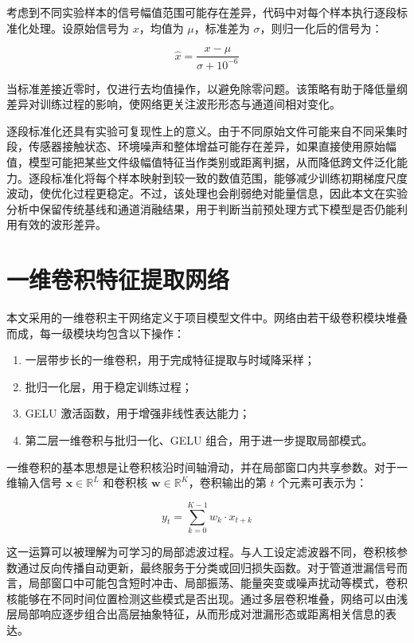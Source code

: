考虑到不同实验样本的信号幅值范围可能存在差异，代码中对每个样本执行逐段标准化处理。设原始信号为 $x$，均值为 $\mu$，标准差为 $\sigma$，则归一化后的信号为：

\begin{equation}
\hat{x} = \frac{x - \mu}{\sigma + 10^{-6}}
\end{equation}

当标准差接近零时，仅进行去均值操作，以避免除零问题。该策略有助于降低量纲差异对训练过程的影响，使网络更关注波形形态与通道间相对变化。

逐段标准化还具有实验可复现性上的意义。由于不同原始文件可能来自不同采集时段，传感器接触状态、环境噪声和整体增益可能存在差异，如果直接使用原始幅值，模型可能把某些文件级幅值特征当作类别或距离判据，从而降低跨文件泛化能力。逐段标准化将每个样本映射到较一致的数值范围，能够减少训练初期梯度尺度波动，使优化过程更稳定。不过，该处理也会削弱绝对能量信息，因此本文在实验分析中保留传统基线和通道消融结果，用于判断当前预处理方式下模型是否仍能利用有效的波形差异。

\section{一维卷积特征提取网络}

本文采用的一维卷积主干网络定义于项目模型文件中。网络由若干级卷积模块堆叠而成，每一级模块均包含以下操作：

\begin{enumerate}
  \item 一层带步长的一维卷积，用于完成特征提取与时域降采样；
  \item 批归一化层，用于稳定训练过程；
  \item GELU 激活函数，用于增强非线性表达能力；
  \item 第二层一维卷积与批归一化、GELU 组合，用于进一步提取局部模式。
\end{enumerate}

一维卷积的基本思想是让卷积核沿时间轴滑动，并在局部窗口内共享参数。对于一维输入信号 $\mathbf{x} \in \mathbb{R}^{L}$ 和卷积核 $\mathbf{w} \in \mathbb{R}^{K}$，卷积输出的第 $t$ 个元素可表示为：

\begin{equation}
y_t = \sum_{k=0}^{K-1} w_k \cdot x_{t + k}
\end{equation}

这一运算可以被理解为可学习的局部滤波过程。与人工设定滤波器不同，卷积核参数通过反向传播自动更新，最终服务于分类或回归损失函数。对于管道泄漏信号而言，局部窗口中可能包含短时冲击、局部振荡、能量突变或噪声扰动等模式，卷积核能够在不同时间位置检测这些模式是否出现。通过多层卷积堆叠，网络可以由浅层局部响应逐步组合出高层抽象特征，从而形成对泄漏形态或距离相关信息的表达\cite{goodfellow2016deep}。

